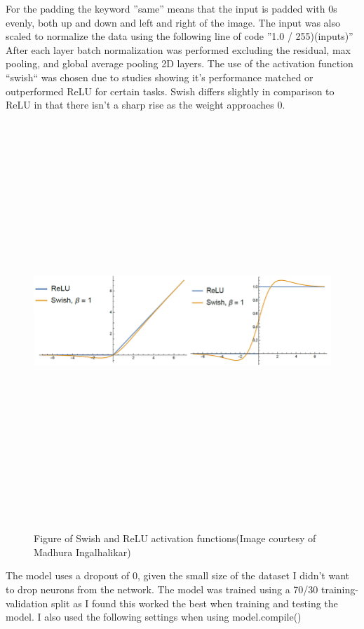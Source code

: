 For the padding the keyword ''same'' means that the input is padded with 0s evenly, both up and down and left and right of the image. The input was also scaled to normalize the data using the following line of code ''1.0 / 255)(inputs)''  After each layer batch normalization was performed excluding the residual, max pooling, and global average pooling 2D layers.  The use of the activation function ``swish`` was chosen due to studies showing it's performance matched or outperformed ReLU for certain tasks\cite{swishAndRelu}. Swish differs slightly in comparison to ReLU in that there isn't a sharp rise as the weight approaches 0. 
 \begin{figure}[H]
    \centering
    \includegraphics[width=1\textwidth,height=15cm,keepaspectratio]{Images/Swish ReLU activations.PNG}\\
    \caption{Figure of Swish and ReLU activation functions(Image courtesy of Madhura Ingalhalikar)\cite{swishReluDiagram}}
    \label{fig:Figure of Swish and ReLU activation functions}
\end{figure}
The model uses a dropout of 0, given the small size of the dataset I didn't want to drop neurons from the network.  The model was trained using a 70/30 training-validation split as I found this worked the best when training and testing the model. I also used the following settings when using model.compile() 
